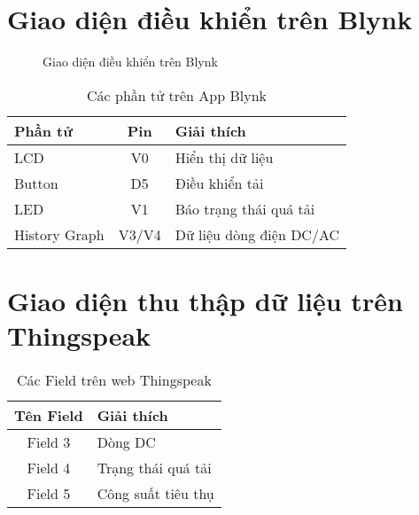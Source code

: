 \section{Giao diện điều khiển trên Blynk}
    \begin{figure}[htp]
        \begin{center}
        \end{center}
        \caption{Giao diện điều khiển trên Blynk}
    \end{figure}

    \begin{table}[htp]
        \begin{center}
            \begin{tabular}{|l|c|l|} \hline
                \textbf{Phần tử} & \textbf{Pin} & \textbf{Giải thích} \\
                \hline
                LCD & V0 & Hiển thị dữ liệu \\
                \hline
                Button & D5 & Điều khiển tải \\
                \hline
                LED & V1 & Báo trạng thái quá tải \\
                \hline
                History Graph & V3/V4 & Dữ liệu dòng điện DC/AC\\
                \hline
            \end{tabular}
        \end{center}
        \caption{Các phần tử trên App Blynk}
    \end{table}

\newpage
\section{Giao diện thu thập dữ liệu trên Thingspeak}
    \begin{table}[htp]
        \begin{center}
            \begin{tabular}{|c|l|} \hline
                \textbf{Tên Field} & \textbf{Giải thích} \\
                \hline
                Field 3 & Dòng DC \\
                \hline
                Field 4 & Trạng thái quá tải \\
                \hline
                Field 5 & Công suất tiêu thụ \\
                \hline
            \end{tabular}
        \end{center}
        \caption{Các Field trên web Thingspeak}
    \end{table}
